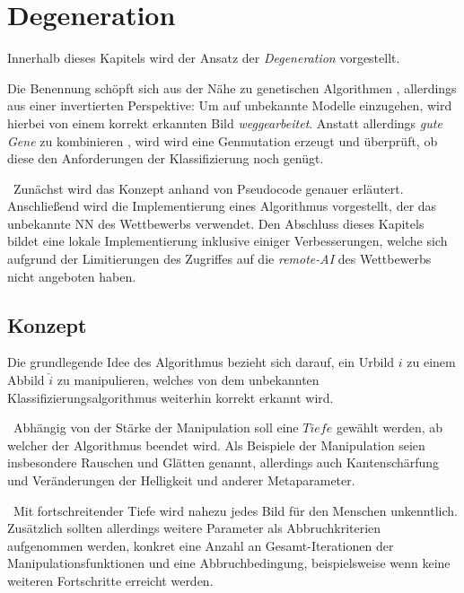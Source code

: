\chapter{Degeneration}
\label{cha:Degeneration}
Innerhalb dieses Kapitels wird der Ansatz der \textit{Degeneration} vorgestellt.

Die Benennung schöpft sich aus der Nähe zu genetischen Algorithmen \cite{heistermann2013genetische}, allerdings aus einer invertierten Perspektive: Um auf unbekannte Modelle einzugehen, wird hierbei von einem korrekt erkannten Bild \textit{weggearbeitet}. Anstatt allerdings \textit{gute Gene} zu kombinieren \cite{schoneburg1994genetische}, wird wird eine Genmutation erzeugt und überprüft, ob diese den Anforderungen der Klassifizierung noch genügt. 

~\newline Zunächst wird das Konzept anhand von Pseudocode genauer erläutert. Anschließend wird die Implementierung eines Algorithmus vorgestellt, der das unbekannte \ac{NN} des Wettbewerbs verwendet. Den Abschluss dieses Kapitels bildet eine lokale Implementierung inklusive einiger Verbesserungen, welche sich aufgrund der Limitierungen des Zugriffes auf die \textit{remote-AI} des Wettbewerbs nicht angeboten haben.
\section{Konzept}
\label{sec:DegenerationKonzept}
Die grundlegende Idee des Algorithmus bezieht sich darauf, ein Urbild $i$ zu einem Abbild $\hat{i}$ zu manipulieren, welches von dem unbekannten Klassifizierungsalgorithmus weiterhin korrekt erkannt wird. 

~\newline Abhängig von der Stärke der Manipulation soll eine $Tiefe$ gewählt werden, ab welcher der Algorithmus beendet wird. Als Beispiele der Manipulation seien insbesondere Rauschen und Glätten genannt, allerdings auch Kantenschärfung und Veränderungen der Helligkeit und anderer Metaparameter. 

~\newline Mit fortschreitender Tiefe wird nahezu jedes Bild für den Menschen unkenntlich. Zusätzlich sollten allerdings weitere Parameter als Abbruchkriterien aufgenommen werden, konkret eine Anzahl an Gesamt-Iterationen der Manipulationsfunktionen und eine Abbruchbedingung, beispielsweise wenn keine weiteren Fortschritte erreicht werden.

\newpage
